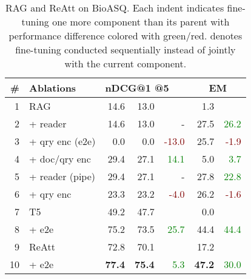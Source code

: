 \documentclass[11pt, dvipsnames]{article}
\def\middlecol{\hskip 6pt}
\newcommand{\ours}{ReAtt\xspace}
\newcommand{\squad}{\hspace{0.5em}}
\newcommand{\hlrow}{\rowcolor{LightCyan!50}}
\newcommand{\dlrow}{\rowcolor{gray!20}}
\newcommand{\better}[1]{\textcolor{Green}{#1}}
\newcommand{\worse}[1]{\textcolor{Maroon}{#1}}
\begin{document}
\begin{table}[tb]
\centering
\small
\begin{tabular}{r@{\middlecol}l@{\middlecol}r@{\middlecol}r@{\middlecol}r|r@{\middlecol}r}
\toprule
\# & \textbf{Ablations} & \multicolumn{3}{l|}{{\footnotesize\textbf{nDCG@1 @5}}} & \multicolumn{2}{c}{\textbf{EM}} \\
\hline
\dlrow 1 & RAG & 14.6 & 13.0 &  & 1.3 & \\
2 & \squad+ reader & 14.6 & 13.0 & - & 27.5 & \better{26.2} \\
\hlrow 3 & \squad\squad+ qry enc (e2e) & 0.0 & 0.0 & \worse{-13.0} & 25.7 & \worse{-1.9} \\
4 & \squad+ doc/qry enc & 29.4 & 27.1 & \better{14.1} & 5.0 & \better{3.7} \\
5 & \squad\squad+ reader (pipe) & 29.4 & 27.1 & - & 27.8 & \better{22.8} \\
6 & \squad\squad\squad+ qry enc & 23.3 & 23.2 & \worse{-4.0} & 26.2 & \worse{-1.6} \\
\hline
\dlrow 7 & T5 & 49.2 & 47.7 & & 0.0 & \\
\hlrow 8 & \squad+ e2e & 75.2 & 73.5 & \better{25.7} & 44.4 & \better{44.4} \\
\hline
\dlrow 9 & \ours & 72.8 & 70.1 & & 17.2 & \\
\hlrow 10 & \squad+ e2e & \textbf{77.4} & \textbf{75.4} & \better{5.3} & \textbf{47.2} & \better{30.0} \\
\hline
\end{tabular}
\caption{RAG and \ours on BioASQ. Each indent indicates fine-tuning one more component than its parent with performance difference colored with green/red.  denotes fine-tuning conducted sequentially instead of jointly with the current component.}
\label{tab:adapt_rag}
\end{table}
\end{document}
